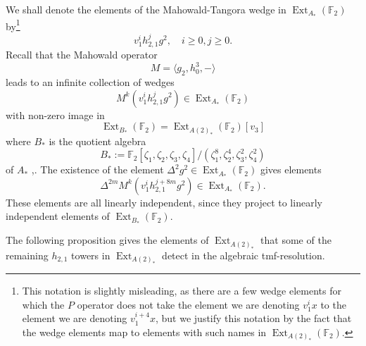 \documentclass[10pt]{amsart}
\newcommand{\bra}[1]{\langle #1 \rangle}
\newcommand{\FF}{\mathbb{F}}
\theoremstyle{definition}
\numberwithin{equation}{section}
\numberwithin{figure}{section}
\DeclareMathOperator{\Ext}{Ext}
\begin{document}
We shall denote the elements of the Mahowald-Tangora wedge \cite{MahowaldTangora} in $\Ext_{A_*}(\FF_2)$ by\footnote{This notation is slightly misleading, as there are a few wedge elements for which the $P$ operator does not take the element we are denoting $v_1^i x$ to the element we are denoting $v_1^{i+4}x$, but we justify this notation by the fact that the wedge elements map to elements with such names in $\Ext_{A(2)_*}(\FF_2)$. }
$$ v_1^i h_{2,1}^j g^2, \quad i \ge 0, j \ge 0. $$
Recall that the Mahowald operator
$$ M = \bra{g_2, h_0^3, -} $$
leads to an infinite collection of wedges
$$ M^k(v_1^i h_{2,1}^j g^2) \in \Ext_{A_*}(\FF_2) $$
with non-zero image in 
$$\Ext_{B_*}(\FF_2) = \Ext_{A(2)_*}(\FF_2)[v_3] $$
where $B_*$ is the quotient algebra
\begin{equation}\label{eq:Bstar}
 B_* := \FF_2[\zeta_1, \zeta_2, \zeta_3, \zeta_4]/(\zeta_1^8, \zeta_2^4, \zeta_3^2, \zeta_4^2)
 \end{equation}
of $A_*$ \cite{MargolisPriddyTangora},\cite{IsaksenMO}. 
The existence of the element $\Delta^2 g^2 \in \Ext_{A_*}(\FF_2)$ gives elements  
$$ \Delta^{2m} M^k(v_1^i h_{2,1}^{j+8m} g^2) \in \Ext_{A_*}(\FF_2). $$
These elements are all linearly independent, since they project to linearly independent elements of $\Ext_{B_*}(\FF_2)$.

The following proposition gives the elements of $\Ext_{A(2)_*}$ that some of the remaining $h_{2,1}$ towers in $\Ext_{A(2)_*}$ detect in the algebraic tmf-resolution.
\end{document}
